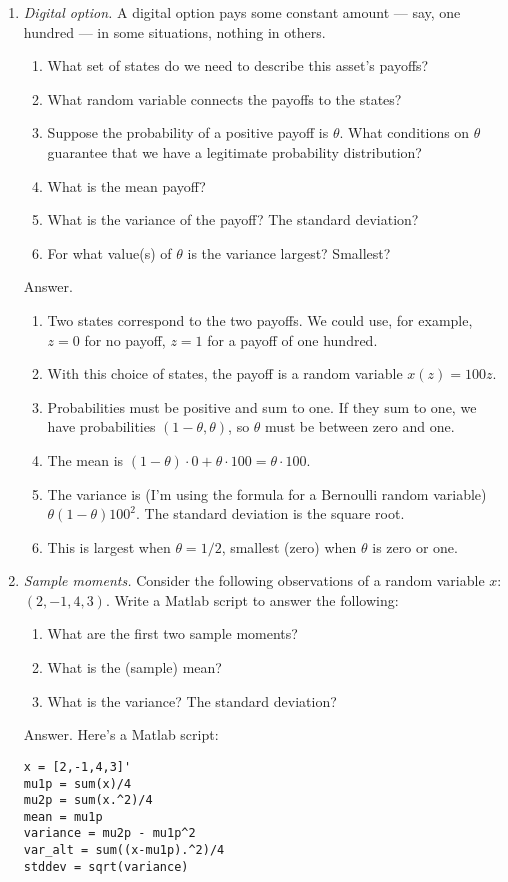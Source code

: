 \documentclass[11pt]{article}
\begin{document}
\begin{enumerate}
\item {\it Digital option.\/}
A digital option pays some constant amount --- say, one hundred ---
in some situations, nothing in others.
\begin{enumerate}
\item What set of states do we need to describe this asset's payoffs?
\item What random variable connects the payoffs to the states?
\item Suppose the probability of a positive payoff is $\theta$.
What conditions on $\theta$ guarantee that we have a legitimate probability distribution?
\item What is the mean payoff?
\item What is the variance of the payoff?
The standard deviation?
\item For what value(s) of $\theta$ is the variance largest?  Smallest?
\end{enumerate}
%
Answer.
\begin{enumerate}
\item Two states correspond to the two payoffs.  We could use, for example,
$z=0$ for no payoff, $z=1$ for a payoff of one hundred.
\item With this choice of states, the payoff is a random variable $x(z) = 100 z$.
\item Probabilities must be positive and sum to one.
If they sum to one, we have probabilities $(1-\theta, \theta)$,
so $\theta$ must be between zero and one.
\item The mean is $ (1-\theta) \cdot 0 + \theta \cdot 100 = \theta \cdot 100 $.
\item The variance is (I'm using the formula for a Bernoulli random variable)
$ \theta (1-\theta) 100^2$.
The standard deviation is the square root.
\item This is largest when $\theta = 1/2$, smallest (zero) when $\theta$ is zero or one.
\end{enumerate}

\item {\it Sample moments.\/}
Consider the following observations of a random variable $x$:
 $ (2, -1, 4, 3)$.
 Write a Matlab script to answer the following:
\begin{enumerate}
\item What are the first two sample moments?
\item What is the (sample) mean?
\item What is the variance?  The standard deviation?
\end{enumerate}
%
Answer.
Here's a Matlab script:
\begin{verbatim}
x = [2,-1,4,3]'
mu1p = sum(x)/4
mu2p = sum(x.^2)/4
mean = mu1p
variance = mu2p - mu1p^2
var_alt = sum((x-mu1p).^2)/4
stddev = sqrt(variance)
\end{verbatim}


\end{enumerate}
\end{document}
